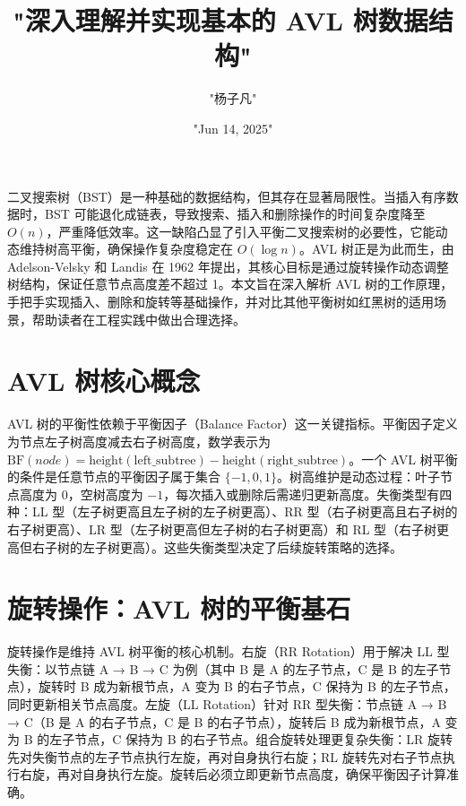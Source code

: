 \title{"深入理解并实现基本的 AVL 树数据结构"}
\author{"杨子凡"}
\date{"Jun 14, 2025"}
\maketitle
二叉搜索树（BST）是一种基础的数据结构，但其存在显著局限性。当插入有序数据时，BST 可能退化成链表，导致搜索、插入和删除操作的时间复杂度降至 $O(n)$，严重降低效率。这一缺陷凸显了引入平衡二叉搜索树的必要性，它能动态维持树高平衡，确保操作复杂度稳定在 $O(\log n)$。AVL 树正是为此而生，由 Adelson-Velsky 和 Landis 在 1962 年提出，其核心目标是通过旋转操作动态调整树结构，保证任意节点高度差不超过 1。本文旨在深入解析 AVL 树的工作原理，手把手实现插入、删除和旋转等基础操作，并对比其他平衡树如红黑树的适用场景，帮助读者在工程实践中做出合理选择。\par
\chapter{AVL 树核心概念}
AVL 树的平衡性依赖于平衡因子（Balance Factor）这一关键指标。平衡因子定义为节点左子树高度减去右子树高度，数学表示为 $\text{BF}(node) = \text{height}(\text{left\_subtree}) - \text{height}(\text{right\_subtree})$。一个 AVL 树平衡的条件是任意节点的平衡因子属于集合 $\{-1, 0, 1\}$。树高维护是动态过程：叶子节点高度为 0，空树高度为 $-1$，每次插入或删除后需递归更新高度。失衡类型有四种：LL 型（左子树更高且左子树的左子树更高）、RR 型（右子树更高且右子树的右子树更高）、LR 型（左子树更高但左子树的右子树更高）和 RL 型（右子树更高但右子树的左子树更高）。这些失衡类型决定了后续旋转策略的选择。\par
\chapter{旋转操作：AVL 树的平衡基石}
旋转操作是维持 AVL 树平衡的核心机制。右旋（RR Rotation）用于解决 LL 型失衡：以节点链 A → B → C 为例（其中 B 是 A 的左子节点，C 是 B 的左子节点），旋转时 B 成为新根节点，A 变为 B 的右子节点，C 保持为 B 的左子节点，同时更新相关节点高度。左旋（LL Rotation）针对 RR 型失衡：节点链 A → B → C（B 是 A 的右子节点，C 是 B 的右子节点），旋转后 B 成为新根节点，A 变为 B 的左子节点，C 保持为 B 的右子节点。组合旋转处理更复杂失衡：LR 旋转先对失衡节点的左子节点执行左旋，再对自身执行右旋；RL 旋转先对右子节点执行右旋，再对自身执行左旋。旋转后必须立即更新节点高度，确保平衡因子计算准确。\par
